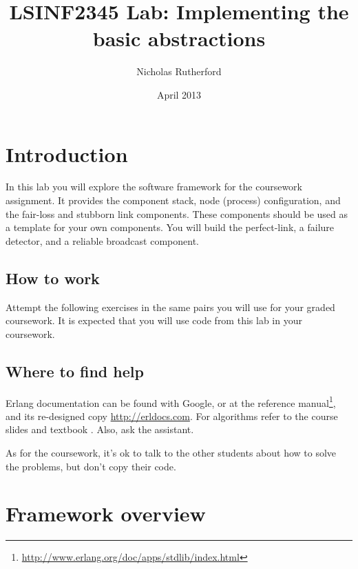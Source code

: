 \documentclass[a4paper]{article}
\title{LSINF2345 Lab: Implementing the basic abstractions}
\author{Nicholas Rutherford}
\date{April 2013}
\begin{document}
\lstset{language=erlang}

\ifpdf
{}
\else
{}
\fi

\maketitle


\section{Introduction}

In this lab you will explore the software framework for the coursework
assignment. It provides the component stack, node (process) configuration,
and the fair-loss and stubborn link components. These components should be
used as a template for your own components. You will build the perfect-link,
a failure detector, and a reliable broadcast component.

\subsection{How to work} %
\label{sub:how_to_work}

Attempt the following exercises in the same pairs you will use for your graded
coursework. It is expected that you will use code from this lab in your
coursework.


\subsection{Where to find help} %
\label{sub:where_to_find_help}

Erlang documentation can be found with Google, or at the reference
manual\footnote{\url{http://www.erlang.org/doc/apps/stdlib/index.html}}, and
its re-designed copy \url{http://erldocs.com}.
For algorithms refer to the course slides and textbook \cite{cachin2011}.
Also, ask the assistant.

As for the coursework, it's ok to talk to the other students about how to
solve the problems, but don't copy their code.


\section{Framework overview} %
\label{sec:framework_overview}
\end{document}
